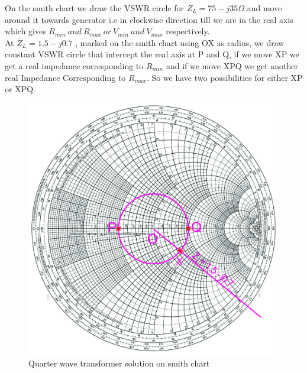 \begin{example}
On the smith chart we draw the VSWR circle for $Z_{L} =75-j35\Omega$ and move around it towards generator i.e in clockwise direction till we are in the real axis which gives $R_{min}\ and\ R_{max}\ or\ V_{min}\ and\ V_{max}$ respectively. \\
At  $ \overline{Z}_L=1.5-j0.7$ , marked on the smith chart using OX as radius, we draw constant VSWR circle that intercept the real axis at P and Q, if we move XP we get a real impedance corresponding to $R_{min}$ and if we move XPQ we get another real Impedance Corresponding to $R_{max}$. So we have two possibilities for either XP or XPQ.
\begin{figure}[h]
\centering
\includegraphics[width=1\linewidth]{./graphics/TOSIN}
\caption{Quarter wave transformer solution on smith chart}
\end{figure}


\end{example}
